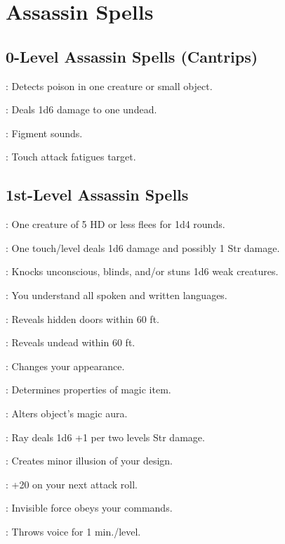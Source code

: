 \section{Assassin Spells}

\begin{multicols}{2}

\subsection{0-Level Assassin Spells (Cantrips)}
\begin{description*}
\item[\linkspell{Detect Poison}:] Detects poison in one creature or small object.
\item[\linkspell{Disrupt Undead}:] Deals 1d6 damage to one undead.
\item[\linkspell{Ghost Sound}:] Figment sounds.
\item[\linkspell{Touch of Fatigue}:] Touch attack fatigues target.
\end{description*}

\subsection{1st-Level Assassin Spells}
\begin{description*}
\item[\linkspell{Cause Fear}:] One creature of 5 HD or less flees for 1d4 rounds.
\item[\linkspell{Chill Touch}:] One touch/level deals 1d6 damage and possibly 1 Str damage.
\item[\linkspell{Color Spray}:] Knocks unconscious, blinds, and/or stuns 1d6 weak creatures.
\item[\linkspell{Comprehend Languages}:] You understand all spoken and written languages.
\item[\linkspell{Detect Secret Doors}:] Reveals hidden doors within 60 ft.
\item[\linkspell{Detect Undead}:] Reveals undead within 60 ft.
\item[\linkspell{Disguise Self}:] Changes your appearance.
\item[\linkspell{Identify}:] Determines properties of magic item.
\item[\linkspell{Nystul’s Magic Aura}:] Alters object’s magic aura.
\item[\linkspell{Ray of Enfeeblement}:] Ray deals 1d6 +1 per two levels Str damage.
\item[\linkspell{Silent Image}:] Creates minor illusion of your design.
\item[\linkspell{True Strike}:] +20 on your next attack roll.
\item[\linkspell{Unseen Servant}:] Invisible force obeys your commands.
\item[\linkspell{Ventriloquism}:] Throws voice for 1 min./level.
\end{description*}


\end{multicols}
